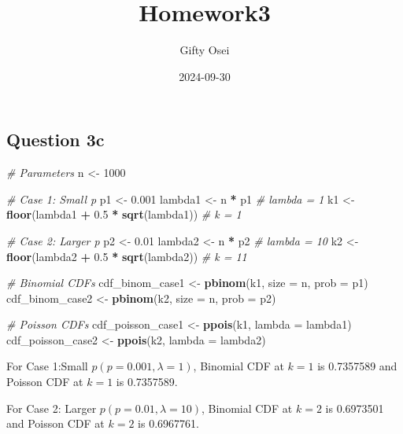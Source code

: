\documentclass[
]{article}
\title{Homework3}
\author{Gifty Osei}
\date{2024-09-30}
\newenvironment{Shaded}{\begin{snugshade}}{\end{snugshade}}
\newcommand{\AttributeTok}[1]{\textcolor[rgb]{0.13,0.29,0.53}{#1}}
\newcommand{\CommentTok}[1]{\textcolor[rgb]{0.56,0.35,0.01}{\textit{#1}}}
\newcommand{\DecValTok}[1]{\textcolor[rgb]{0.00,0.00,0.81}{#1}}
\newcommand{\FloatTok}[1]{\textcolor[rgb]{0.00,0.00,0.81}{#1}}
\newcommand{\FunctionTok}[1]{\textcolor[rgb]{0.13,0.29,0.53}{\textbf{#1}}}
\newcommand{\NormalTok}[1]{#1}
\newcommand{\OtherTok}[1]{\textcolor[rgb]{0.56,0.35,0.01}{#1}}
\newcommand{\SpecialCharTok}[1]{\textcolor[rgb]{0.81,0.36,0.00}{\textbf{#1}}}
\begin{document}
\maketitle

\subsection{Question 3c}\label{question-3c}

\begin{Shaded}
\begin{Highlighting}[]
\CommentTok{\# Parameters}
\NormalTok{n }\OtherTok{\textless{}{-}} \DecValTok{1000}

\CommentTok{\# Case 1: Small p}
\NormalTok{p1 }\OtherTok{\textless{}{-}} \FloatTok{0.001}
\NormalTok{lambda1 }\OtherTok{\textless{}{-}}\NormalTok{ n }\SpecialCharTok{*}\NormalTok{ p1  }\CommentTok{\# lambda = 1}
\NormalTok{k1 }\OtherTok{\textless{}{-}} \FunctionTok{floor}\NormalTok{(lambda1 }\SpecialCharTok{+} \FloatTok{0.5} \SpecialCharTok{*} \FunctionTok{sqrt}\NormalTok{(lambda1))  }\CommentTok{\# k = 1}

\CommentTok{\# Case 2: Larger p}
\NormalTok{p2 }\OtherTok{\textless{}{-}} \FloatTok{0.01}
\NormalTok{lambda2 }\OtherTok{\textless{}{-}}\NormalTok{ n }\SpecialCharTok{*}\NormalTok{ p2  }\CommentTok{\# lambda = 10}
\NormalTok{k2 }\OtherTok{\textless{}{-}} \FunctionTok{floor}\NormalTok{(lambda2 }\SpecialCharTok{+} \FloatTok{0.5} \SpecialCharTok{*} \FunctionTok{sqrt}\NormalTok{(lambda2))  }\CommentTok{\# k = 11}



\CommentTok{\# Binomial CDFs}
\NormalTok{cdf\_binom\_case1 }\OtherTok{\textless{}{-}} \FunctionTok{pbinom}\NormalTok{(k1, }\AttributeTok{size =}\NormalTok{ n, }\AttributeTok{prob =}\NormalTok{ p1)}
\NormalTok{cdf\_binom\_case2 }\OtherTok{\textless{}{-}} \FunctionTok{pbinom}\NormalTok{(k2, }\AttributeTok{size =}\NormalTok{ n, }\AttributeTok{prob =}\NormalTok{ p2)}

\CommentTok{\# Poisson CDFs}
\NormalTok{cdf\_poisson\_case1 }\OtherTok{\textless{}{-}} \FunctionTok{ppois}\NormalTok{(k1, }\AttributeTok{lambda =}\NormalTok{ lambda1)}
\NormalTok{cdf\_poisson\_case2 }\OtherTok{\textless{}{-}} \FunctionTok{ppois}\NormalTok{(k2, }\AttributeTok{lambda =}\NormalTok{ lambda2)}
\end{Highlighting}
\end{Shaded}

\begin{center} For Case 1:Small $p (p = 0.001, \lambda = 1)$, Binomial CDF at $ k=1$ is 0.7357589 and Poisson CDF at $k=1$ is 0.7357589.

For Case 2: Larger $p (p = 0.01, \lambda = 10)$, Binomial CDF at $k=2$ is 0.6973501 and Poisson CDF at $k=2$ is 0.6967761.

\end{center}
\end{document}
